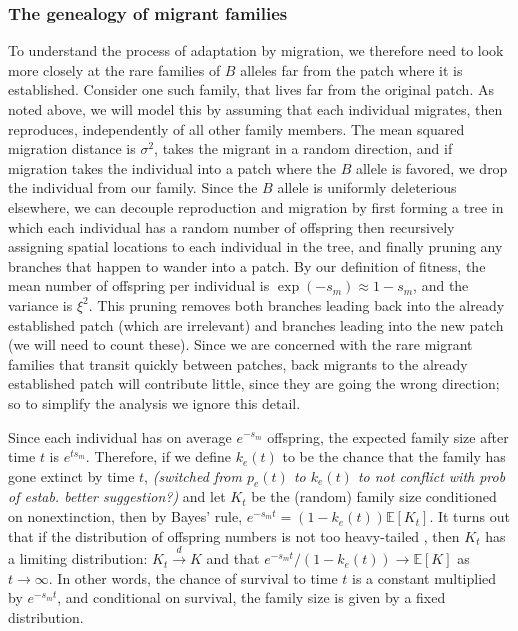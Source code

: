 \documentclass{article}
\newcommand{\E}{\mathbb{E}}
\newcommand{\dconv}{\xrightarrow{d}}
\newcommand{\plr}[1]{{\it\color{blue}(#1)}}
\begin{document}
\subsubsection{The genealogy of migrant families}

To understand the process of adaptation by migration,
we therefore need to look more closely at the rare families of $B$ alleles far from the patch where it is established.
Consider one such family,
that lives far from the original patch.
As noted above, we will model this by assuming that each individual
migrates, then reproduces, independently of all other family members.
The mean squared migration distance is $\sigma^2$, takes the migrant in a random direction,
and if migration takes the individual into a patch where the $B$ allele is favored, 
we drop the individual from our family.
Since the $B$ allele is uniformly deleterious elsewhere,
we can decouple reproduction and migration
by first forming a tree in which each individual has a random number of offspring
then recursively assigning spatial locations to each individual in the tree,
and finally pruning any branches that happen to wander into a patch.
By our definition of fitness, the mean number of offspring per individual is $\exp(-s_m)\approx 1-s_m$,
and the variance is $\xi^2$.
This pruning removes both branches leading back into the already established patch (which are irrelevant)
and branches leading into the new patch (we will need to count these).
Since we are concerned with the rare migrant families that transit quickly between patches, 
back migrants to the already established patch will contribute little, since they are going the wrong direction;
so to simplify the analysis we ignore this detail.  %

Since each individual has on average $e^{-s_m}$ offspring,
the expected family size after time $t$ is $e^{t s_m}$.
Therefore, if we define $k_e(t)$ to be the chance that the family
has gone extinct by time $t$, 
\plr{switched from $p_e(t)$ to $k_e(t)$ to not conflict with prob of estab.  better suggestion?}
and let $K_t$ be the (random) family size conditioned on nonextinction,
then by Bayes' rule, $e^{-s_m t} = (1-k_e(t))\E[K_t]$.
It turns out that if the distribution of offspring numbers is not too heavy-tailed \citep[see][for details]{jagers1975branching},
then $K_t$ has a limiting distribution: $K_t \dconv K$ 
and that $e^{-s_m t}/(1-k_e(t)) \to \E[K]$ as $t \to \infty$.
In other words, the chance of survival to time $t$ is a constant multiplied by $e^{-s_m t}$,
and conditional on survival, the family size is given by a fixed distribution.
\end{document}
